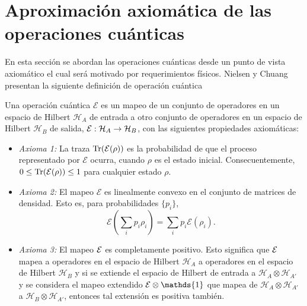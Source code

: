 \section{Aproximación axiomática de las operaciones cuánticas} %
En esta sección se abordan las operaciones cuánticas desde un punto de vista
axiomático el cual será motivado por requerimientos físicos. 
Nielsen y
Chuang {\cite{nielsen_chuang_2010}}
presentan la siguiente definición de operación cuántica \begin{definition}\label{DefE(rho)} Una operación cuántica $\mathcal{E}$ es un mapeo de un conjunto de operadores en un espacio de Hilbert $\mathcal{H}_A$ de entrada a otro conjunto de operadores en un espacio de Hilbert $\mathcal{H}_B$ de salida, $\mathcal{E}: \mathcal{H}_A \rightarrow \mathcal{H}_B$, con las siguientes propiedades axiomáticas:

    \begin{itemize}
        \item \textit{Axioma 1:} La traza ${\rm Tr} (\mathcal{E}(\rho))$ es la probabilidad de que el proceso representado por $\mathcal{E}$ ocurra, cuando $\rho$ es el estado inicial. Consecuentemente, $0 \le {\rm Tr} (\mathcal{E}(\rho)) \le 1$ para cualquier estado $\rho$.
	\item \textit{Axioma 2:} El mapeo $\mathcal{E}$ es linealmente convexo
 en el conjunto de matrices de densidad.
Esto es, para probabilidades
$\{p_i\}$, \[\mathcal{E}\left(\sum _i p_i \rho _i\right)=\sum_i p_i
\mathcal{E}(\rho_i).\]
	\item\textit{Axioma 3:} El mapeo $\mathcal{E}$ es completamente positivo. Esto
significa que $\mathcal{E}$ mapea a operadores en el espacio de Hilbert
$\mathcal{H}_{A}$  a operadores en el espacio de Hilbert $\mathcal{H}_B$ y si
se extiende el espacio de Hilbert de entrada a
$\mathcal{H}_A\otimes\mathcal{H}_{A'}$ y se considera el mapeo extendido $\E
\otimes \mathds{1}$ que mapea de $\mathcal{H}_A \otimes \mathcal{H}_{A'} $ a
$\mathcal{H}_B \otimes \mathcal{H}_{A'}$, entonces tal  extensión es positiva
también. 
    \end{itemize}
\end{definition}

